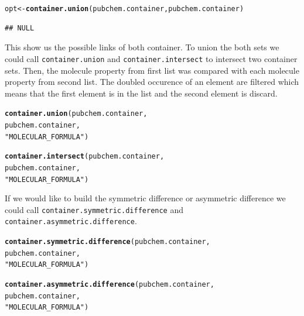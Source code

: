 \documentclass[12pt, a4paper]{scrartcl}\usepackage[]{graphicx}\usepackage[]{color}
\makeatletter
\newcommand{\hlstr}[1]{\textcolor[rgb]{0.192,0.494,0.8}{#1}}%
\newcommand{\hlstd}[1]{\textcolor[rgb]{0.345,0.345,0.345}{#1}}%
\newcommand{\hlkwb}[1]{\textcolor[rgb]{0.69,0.353,0.396}{#1}}%
\newcommand{\hlkwd}[1]{\textcolor[rgb]{0.737,0.353,0.396}{\textbf{#1}}}%
\newenvironment{kframe}{%
 \def\at@end@of@kframe{}%
 \ifinner\ifhmode%
  \def\at@end@of@kframe{\end{minipage}}%
  \begin{minipage}{\columnwidth}%
 \fi\fi%
 \def\FrameCommand##1{\hskip\@totalleftmargin \hskip-\fboxsep
 \colorbox{shadecolor}{##1}\hskip-\fboxsep
     \hskip-\linewidth \hskip-\@totalleftmargin \hskip\columnwidth}%
 \MakeFramed {\advance\hsize-\width
   \@totalleftmargin\z@ \linewidth\hsize
   \@setminipage}}%
 {\par\unskip\endMakeFramed%
 \at@end@of@kframe}
\newenvironment{knitrout}{}{} %
\newcommand{\Rfunction}[1]{{\texttt{#1}}}
\makeatother
\begin{document}
\begin{knitrout}
\color{fgcolor}\begin{kframe}
\begin{alltt}
  \hlstd{opt} \hlkwb{<-} \hlkwd{container.union}\hlstd{(pubchem.container,pubchem.container)}
\end{alltt}
\begin{verbatim}
## NULL
\end{verbatim}


{\ttfamily\noindent\color{warningcolor}{\#\# Warning: Please choose a link from above. You could use the\\\#\#\ \ \ \ \ \ \ \ \ \ function: comm.lib.showLinkOptions(set.a,set.b)}}\end{kframe}
\end{knitrout}

This show us the possible links of both container. To union the both sets we could call \Rfunction{container.union} and \Rfunction{container.intersect} to intersect two container sets. Then, the molecule property from first list was compared with each molecule property from second list. The doubled occurence of an element are filtered which means that the 
first element is in the list and the second element is discard.

\begin{knitrout}
\color{fgcolor}\begin{kframe}
\begin{alltt}
  \hlkwd{container.union}\hlstd{(pubchem.container,}
                  \hlstd{pubchem.container,}
                  \hlstr{"MOLECULAR_FORMULA"}\hlstd{)}

  \hlkwd{container.intersect}\hlstd{(pubchem.container,}
                      \hlstd{pubchem.container,}
                      \hlstr{"MOLECULAR_FORMULA"}\hlstd{)}
\end{alltt}
\end{kframe}
\end{knitrout}

If we would like to build the symmetric difference or asymmetric difference we could call \Rfunction{container.symmetric.difference} and \Rfunction{container.asymmetric.difference}. 

\begin{knitrout}
\color{fgcolor}\begin{kframe}
\begin{alltt}
  \hlkwd{container.symmetric.difference}\hlstd{(pubchem.container,}
                                 \hlstd{pubchem.container,}
                                 \hlstr{"MOLECULAR_FORMULA"}\hlstd{)}

  \hlkwd{container.asymmetric.difference}\hlstd{(pubchem.container,}
                                 \hlstd{pubchem.container,}
                                 \hlstr{"MOLECULAR_FORMULA"}\hlstd{)}
\end{alltt}
\end{kframe}
\end{knitrout}
\end{document}
